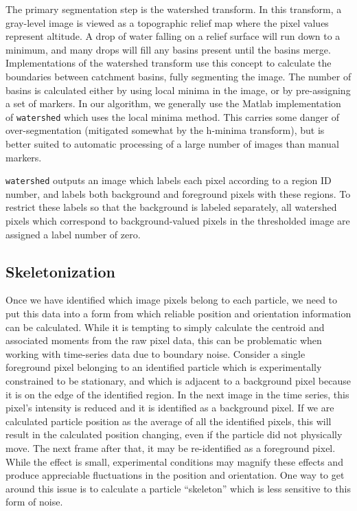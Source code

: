 The primary segmentation step is the watershed transform. In this transform, a gray-level image is viewed as
a topographic relief map where the pixel values represent altitude. A drop of water falling on a relief 
surface will run down to a minimum, and many drops will fill any basins present until the basins merge.
Implementations of the watershed transform use this concept to calculate the boundaries between catchment basins,
fully segmenting the image.  The number of basins is calculated either by using local minima in the image, or by 
pre-assigning a set of markers.  In our algorithm, we generally use the Matlab implementation of \texttt{watershed} which
uses the local minima method.  This carries some danger of over-segmentation (mitigated somewhat by the 
h-minima transform), but is better suited to automatic processing of a large number of images than manual markers.

\texttt{watershed} outputs an image which labels each pixel according to a region ID number, and labels both background
and foreground pixels with these regions. To restrict these labels so that the background is labeled separately, all 
watershed pixels which correspond to background-valued pixels in the thresholded image are assigned a label number of zero.

\subsection{Skeletonization}

Once we have identified which image pixels belong to each particle, we need to put this data into a form from
which reliable position and orientation information can be calculated.  While it is tempting to simply
calculate the centroid and associated moments from the raw pixel data, this can be problematic when working with
time-series data due to boundary noise. Consider a single foreground pixel belonging to 
an identified particle which is experimentally
constrained to be stationary, and which is adjacent to a background pixel because it is on the edge of the identified 
region. In the next image in the time series, this pixel's intensity is reduced and it is identified as a background
pixel.  If we are calculated particle position as the average of all the identified pixels, this will result in 
the calculated position changing, even if the particle did not physically move. The next frame after that, it 
may be re-identified as a foreground pixel.  While the effect is small, experimental conditions may magnify
these effects and produce appreciable fluctuations in the position and orientation. One way to get around this issue
is to calculate a particle ``skeleton'' which is less sensitive to this form of noise.

